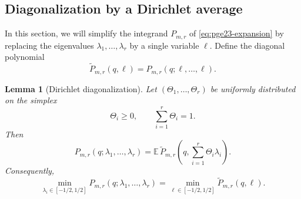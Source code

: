 \documentclass[11pt]{article}
\newtheorem{lemma}[theorem]{Lemma}
\numberwithin{equation}{section}
\newcommand{\E}{\mathbb E}
\begin{document}
\subsection{Diagonalization by a Dirichlet average}

In this section, we will simplify the integrand $P_{m,r}$ of \eqref{eq:pge23-expansion} by replacing the eigenvalues $\lambda_1,\ldots,\lambda_r$ by a single variable $\ell$.
Define the diagonal polynomial
\begin{equation}\label{eq:pge23-Ptilde}
  \widetilde P_{m,r}(q,\ell)
  =P_{m,r}(q;\ell,\ldots,\ell).
\end{equation}

\begin{lemma}[Dirichlet diagonalization]\label{lem:pge23-dirichlet}
  Let $(\Theta_1,\ldots,\Theta_r)$ be uniformly distributed on the simplex
  \[
    \Theta_i\ge0,\qquad \sum_{i=1}^r\Theta_i=1.
  \]
  Then
  \begin{equation}\label{eq:pge23-dirichlet-identity}
    P_{m,r}(q;\lambda_1,\ldots,\lambda_r)
    =\E\,\widetilde P_{m,r}
    \left(q,\sum_{i=1}^r\Theta_i\lambda_i\right).
  \end{equation}
  Consequently,
  \begin{equation}\label{eq:pge23-diagonal-min}
    \min_{\lambda_i\in[-1/2,1/2]}
    P_{m,r}(q;\lambda_1,\ldots,\lambda_r)
    =\min_{\ell\in[-1/2,1/2]}\widetilde P_{m,r}(q,\ell).
  \end{equation}
\end{lemma}
\end{document}
